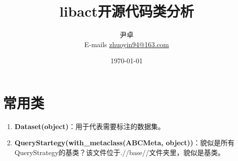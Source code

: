 \documentclass[UTF8, 12pt]{ctexart}
\begin{document}
	\title{\heiti \Huge{libact开源代码类分析}}
	\author{\kaishu 尹卓 \\ E-mails \href{mailto:zhuoyin94@163.com}{zhuoyin94@163.com}}
	\date{\today}
	\maketitle
	
	\tableofcontents
	\newpage
	\section{常用类}
	\begin{enumerate}
		\item \textbf{Dataset(object)}：用于代表需要标注的数据集。
		\item \textbf{QueryStartegy(with\_metaclass(ABCMeta, object))}：貌似是所有QueryStrategy的基类？该文件位于.//base//文件夹里，貌似是基类。
	\end{enumerate}

%	  
%	
\end{document}
